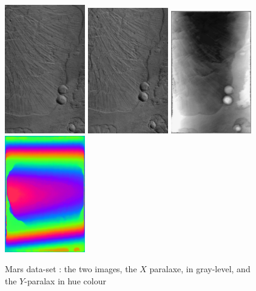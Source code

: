 \begin{figure}
\begin{center}
\includegraphics[width=35mm]{FIGS/Mars/SmaIm1.jpg}
\includegraphics[width=35mm]{FIGS/Mars/SmIm2.jpg}
\includegraphics[width=35mm]{FIGS/Mars/Px1.jpg}
\includegraphics[width=35mm]{FIGS/Mars/Px2.jpg}

\end{center}
\caption{Mars data-set : the two  images, the $X$ paralaxe, in gray-level, and the $Y$-paralax in
hue colour}
\label{FIG:OK:Mars}
\end{figure}

